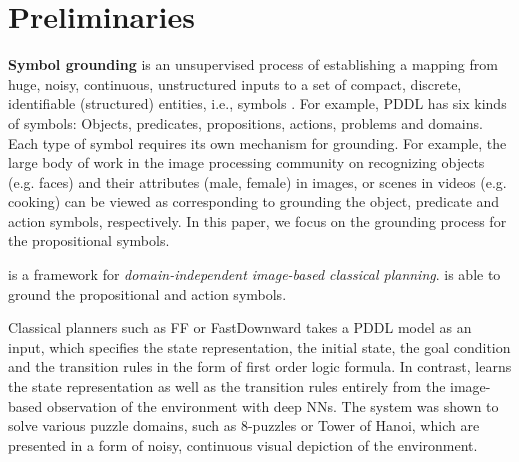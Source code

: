 

\section{Preliminaries}
\label{background}

\textbf{Symbol grounding} is an unsupervised process of establishing a mapping
from huge, noisy, continuous, unstructured inputs
to a set of compact, %
discrete, identifiable (structured) entities, i.e., symbols \cite{Asai2018}.
For example, PDDL has six kinds of symbols: Objects, predicates, propositions, actions, problems and domains.
Each type of symbol requires its own mechanism for grounding.
For example, the large body of work in the image processing community on recognizing 
objects (e.g. faces) and their attributes (male, female) in images, or scenes in videos (e.g. cooking)
can be viewed as corresponding to grounding the object, predicate and action symbols, respectively.
In this paper, we focus on the grounding process for the propositional symbols.

\textbf{\latentplanner} \cite{Asai2018} is a framework for
\emph{domain-independent image-based classical planning}.
\latentplanner is able to ground
the propositional and action symbols.

Classical planners such as FF \cite{Hoffmann01} or
FastDownward \cite{Helmert04} takes a PDDL model as an input, which
specifies the state representation, the initial state, the goal
condition and the transition rules in the form of first order logic
formula.  In contrast, \latentplanner learns the state representation as well as the transition rules
entirely from the image-based observation of the environment with deep NNs.
The system was shown to solve various puzzle domains, such as 8-puzzles or Tower of Hanoi,
which are presented in a form of noisy, continuous visual depiction of the environment.

